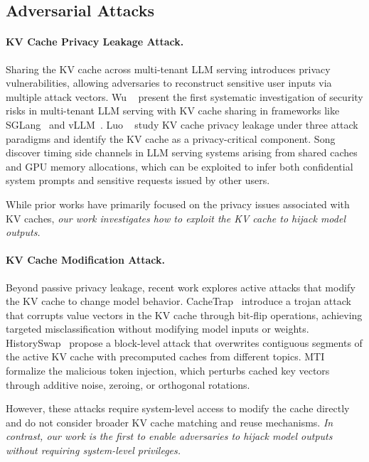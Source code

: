 \subsection{Adversarial Attacks}


\paragraph{KV Cache Privacy Leakage Attack.}
Sharing the KV cache across multi-tenant LLM serving introduces privacy vulnerabilities, allowing adversaries to reconstruct sensitive user inputs via multiple attack vectors.
% 
Wu \etal~\cite{wu2025know} present the first systematic investigation of security risks in multi-tenant LLM serving with KV cache sharing in frameworks like SGLang~\cite{zheng2024sglang} and vLLM~\cite{kwon2023efficient}. 
% 
Luo \etal~\cite{luo2025shadow} study KV cache privacy leakage under three attack paradigms and identify the KV cache as a privacy-critical component.
% 
Song \etal~\cite{song2025early} discover timing side channels in LLM serving systems arising from shared caches and GPU memory allocations, which can be exploited to infer both confidential system prompts and sensitive requests issued by other users.

While prior works have primarily focused on the privacy issues associated with KV caches, \textit{our work investigates how to exploit the KV cache to hijack model outputs.}

\paragraph{KV Cache Modification Attack.}
Beyond passive privacy leakage, recent work explores active attacks that modify the KV cache to change model behavior. 
% 
CacheTrap~\cite{nahian2025cachetrap} introduce a trojan attack that corrupts value vectors in the KV cache through bit-flip operations, achieving targeted misclassification without modifying model inputs or weights. 
% 
HistorySwap~\cite{ganesh2025whose} propose a block-level attack that overwrites contiguous segments of the active KV cache with precomputed caches from different topics. 
% 
MTI~\cite{hossain2025can} formalize the malicious token injection, which perturbs cached key vectors through additive noise, zeroing, or orthogonal rotations. 

However, these attacks require system-level access to modify the cache directly and do not consider broader KV cache matching and reuse mechanisms. \emph{In contrast, our work is the first to enable adversaries to hijack model outputs without requiring system-level privileges.}

